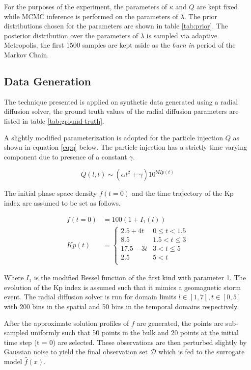\documentclass{article}
\begin{document}
For the purposes of the experiment, the parameters of $\kappa$ and $Q$ are kept fixed while MCMC inference 
is performed on the parameters of $\lambda$. The prior distributions chosen for the parameters 
are shown in table \ref{tab:prior}. The posterior distribution over the parameters of $\lambda$ is 
sampled via adaptive Metropolis, the first 1500 samples are kept aside as the \emph{burn in} period
of the Markov Chain.

\subsection*{Data Generation}

The technique presented is applied on synthetic data generated using a radial diffusion solver, 
the ground truth values of the radial diffusion parameters are listed in table \ref{tab:ground-truth}.

A slightly modified parameterization is adopted for the particle injection $Q$ as shown in equation \ref{eq:q}
below. The particle injection has a strictly time varying component due to presence of a constant $\gamma$.

\begin{equation}\label{eq:q}
Q(l,t)  \sim (\alpha l^{\beta} + \gamma) 10^{b Kp(t)}
\end{equation}

The initial phase space density $f(t = 0)$ and the time trajectory 
of the Kp index are assumed to be set as follows.

\begin{align}
f(t = 0) &= 100(1 + I_1(l)) \\
Kp(t) &= \left\{\begin{matrix}
2.5 + 4t & 0 \leq t < 1.5\\ 
8.5 & 1.5 < t \leq 3\\ 
17.5-3t & 3 <  t \leq 5 \\ 
2.5 & 5 < t\\ 
\end{matrix}\right.
\end{align}

Where $I_1$ is the modified Bessel function of the first kind with parameter 1. 
The evolution of the Kp index is assumed such that it mimics a geomagnetic storm event. 
The radial diffusion solver is run for domain limits $l \in [1, 7], t \in [0, 5]$ with
200 bins in the spatial and 50 bins in the temporal domains respectively.

After the approximate solution profiles of $f$ are generated, the points are sub-sampled
uniformly such that 50 points in the bulk and 20 points at the initial time step (t = 0)
are selected. These observations are then perturbed slightly by Gaussian noise to yield
the final observation set $\mathcal{D}$ which is fed to the surrogate model $\hat{f}(x)$.
\end{document}
